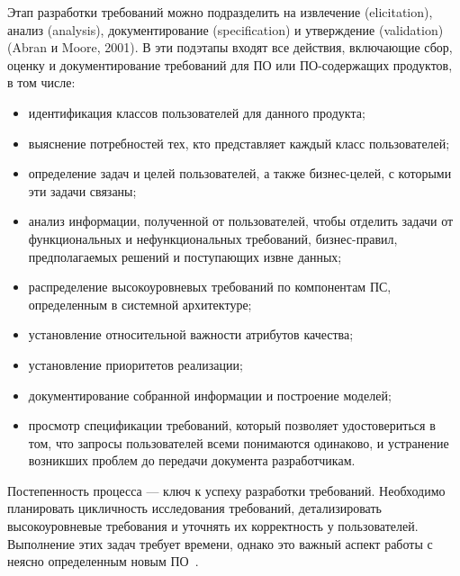 \documentclass{../industrial-development}
\begin{document}
\lecturenotes

 Этап разработки требований можно подразделить на извлечение (elicitation), анализ (analysis), документирование (specification) и утверждение (validation) (Abran и Moore, 2001). В эти подэтапы входят все действия, включающие сбор, оценку и документирование требований для ПО
или ПО-содержащих продуктов, в том числе:
	\begin{itemize}
\item идентификация классов пользователей для данного продукта;
\item выяснение потребностей тех, кто представляет каждый класс пользователей;
\item определение задач и целей пользователей, а также бизнес-целей, с которыми эти задачи связаны;
\item анализ информации, полученной от пользователей, чтобы отделить задачи от функциональных и нефункциональных требований, бизнес-правил, предполагаемых решений и поступающих извне данных;
\item распределение высокоуровневых требований по компонентам ПС, определенным в системной архитектуре;
\item установление относительной важности атрибутов качества;
\item установление приоритетов реализации;
\item документирование собранной информации и построение моделей;
\item просмотр спецификации требований, который позволяет удостовериться в том, что запросы пользователей всеми понимаются одинаково, и устранение возникших проблем до передачи документа разработчикам.
\end{itemize}

Постепенность процесса — ключ к успеху разработки требований. Необходимо планировать цикличность исследования требований, детализировать высокоуровневые требования и уточнять их корректность у пользователей. Выполнение этих задач требует времени, однако это важный аспект работы с неясно определенным новым ПО~\cite[с.~12-13]{Wiegers}.

\end{document}
